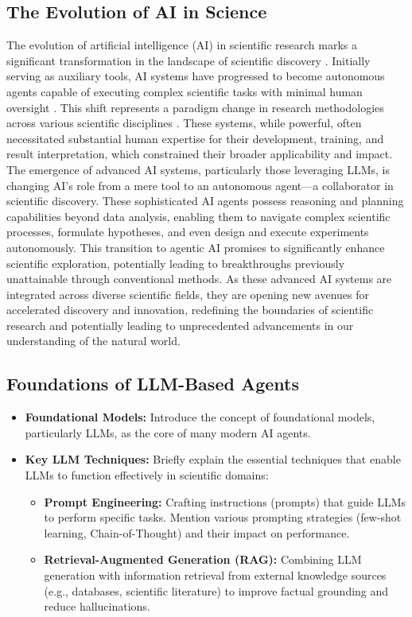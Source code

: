 \documentclass{article}
\begin{document}
\subsection{The Evolution of AI in Science}
The evolution of artificial intelligence (AI) in scientific research marks a significant 
transformation in the landscape of scientific discovery \cite{wang2023scientific}.
Initially serving as auxiliary tools, AI systems have progressed to become autonomous agents 
capable of executing complex scientific tasks with minimal human oversight \cite{boiko2023autonomous}.
This shift represents a paradigm change in research methodologies across various scientific disciplines
\cite{vamathevan2019applications, jordan2015machine,bifarin2021machine}. These systems, while powerful, 
often necessitated substantial human expertise for their development, training, and result interpretation, 
which constrained their broader applicability and impact. The emergence of advanced AI systems, 
particularly those leveraging LLMs, is changing AI's role from a mere tool to an autonomous 
agent—a collaborator in scientific discovery. These sophisticated AI agents possess reasoning and planning 
capabilities beyond data analysis, enabling them to navigate complex scientific processes, formulate hypotheses, 
and even design and execute experiments autonomously. This transition to agentic AI promises to significantly 
enhance scientific exploration, potentially leading to breakthroughs previously unattainable through 
conventional methods. As these advanced AI systems are integrated across diverse scientific fields, they 
are opening new avenues for accelerated discovery and innovation, redefining the boundaries of scientific 
research and potentially leading to unprecedented advancements in our understanding of the natural world.


\subsection{Foundations of LLM-Based Agents}
\begin{itemize}
    \item \textbf{Foundational Models:} Introduce the concept of foundational models, particularly LLMs, as the core of many modern AI agents.
    \item \textbf{Key LLM Techniques:} Briefly explain the essential techniques that enable LLMs to function effectively in scientific domains:
    \begin{itemize}
        \item \textbf{Prompt Engineering:} Crafting instructions (prompts) that guide LLMs to perform specific tasks. Mention various prompting strategies (few-shot learning, Chain-of-Thought) and their impact on performance.
        \item \textbf{Retrieval-Augmented Generation (RAG):} Combining LLM generation with information retrieval from external knowledge sources (e.g., databases, scientific literature) to improve factual grounding and reduce hallucinations.
    \end{itemize}
\end{itemize}
\end{document}
